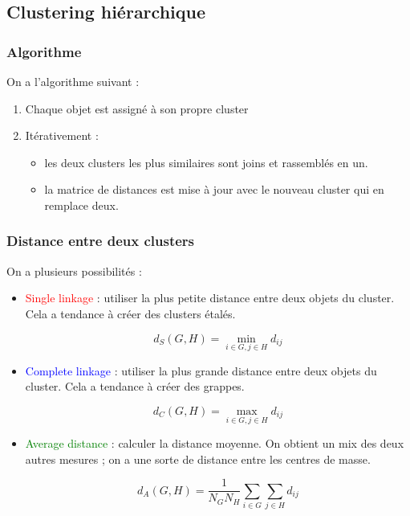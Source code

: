 	\subsection{Clustering hiérarchique}
	
		\subsubsection{Algorithme}
		On a l'algorithme suivant :
	
		\begin{enumerate}
			\item Chaque objet est assigné à son propre cluster
			\item Itérativement :
		
			\begin{itemize}
				\item les deux clusters les plus similaires sont joins et rassemblés en un.
				\item la matrice de distances est mise à jour avec le nouveau cluster qui en remplace deux.
			\end{itemize}
		\end{enumerate}
				
		
		\subsubsection{Distance entre deux clusters}
		
		On a plusieurs possibilités :
		
		\begin{itemize}
			\item \textcolor{red}{Single linkage} : utiliser la plus petite distance entre deux objets du cluster. Cela a tendance à créer des clusters étalés.
			
			$$d_S(G, H) = \min_{i \in G, j \in H} d_{ij}$$
			
			\item \textcolor{blue}{Complete linkage} : utiliser la plus grande distance entre deux objets du cluster. Cela a tendance à créer des grappes.
			
			$$d_C(G, H) = \max_{i \in G, j \in H} d_{ij}$$
			
			\item \textcolor{green}{Average distance} : calculer la distance moyenne. On obtient un mix des deux autres mesures ; on a une sorte de distance entre les centres de masse.
						
			$$d_A(G, H) = \frac{1}{N_GN_H} \sum_{i \in G} \sum_{j \in H} d_{ij}$$
			
		\end{itemize}
				

